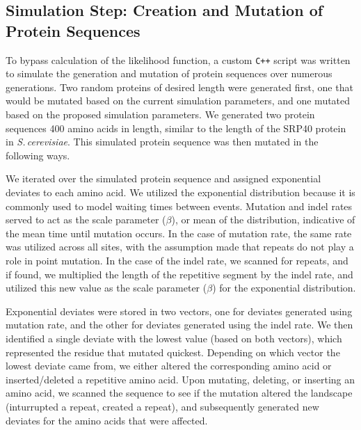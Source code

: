 \documentclass[10pt]{article}
\newcommand{\scshrt}{\mbox{\textit{S.\,cerevisiae}}\xspace}
\begin{document}
\subsection{Simulation Step: Creation and Mutation of Protein Sequences}

To bypass calculation of the likelihood function, a custom \texttt{C++} script was written to simulate the generation and mutation of protein sequences over numerous generations. Two random proteins of desired length were generated first, one that would be mutated based on the current simulation parameters, and one mutated based on the proposed simulation parameters. We generated two protein sequences 400 amino acids in length, similar to the length of the SRP40 protein in \scshrt. This simulated protein sequence was then  mutated in the following ways.

We iterated over the simulated protein sequence and assigned exponential deviates to each amino acid. We utilized the exponential distribution because it is commonly used to model waiting times between events. Mutation and indel rates served to act as the scale parameter ($\beta$), or mean of the distribution, indicative of the mean time until mutation occurs. In the case of mutation rate, the same rate was utilized across all sites, with the assumption made that repeats do not play a role in point mutation. In the case of the indel rate, we scanned for repeats, and if found, we multiplied the length of the repetitive segment by the indel rate, and utilized this new value as the scale parameter ($\beta$) for the exponential distribution.

Exponential deviates were stored in two vectors, one for deviates generated using mutation rate, and the other for deviates generated using the indel rate. We then identified a single deviate with the lowest value (based on both vectors), which represented the residue that mutated quickest. Depending on which vector the lowest deviate came from, we either altered the corresponding amino acid or inserted/deleted a repetitive amino acid. Upon mutating, deleting, or inserting an amino acid, we scanned the sequence to see if the mutation altered the landscape (inturrupted a repeat, created a repeat), and subsequently generated new deviates for the amino acids that were affected.
\end{document}
